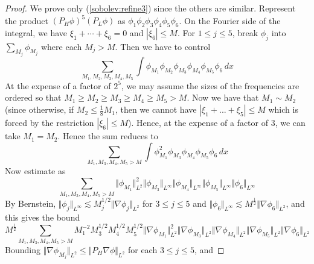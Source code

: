 \documentclass[12pt,letterpaper,leqno]{amsart}
\theoremstyle{plain}
\numberwithin{equation}{section}
\numberwithin{theorem}{section}
\numberwithin{proposition}{section}
\numberwithin{lemma}{section}
\numberwithin{corollary}{section}
\begin{document}
\begin{proof}
We prove only (\ref{sobolev:refine3}) since the others are similar.
Represent the product $\left( P_{H}\phi \right) ^{5}\left( P_{L}\phi \right) 
$ as $\phi _{1}\phi _{2}\phi _{3}\phi _{4}\phi _{5}\phi _{6}$. On the
Fourier side of the integral, we have $\xi _{1}+\cdots +\xi _{6}=0$ and $%
\left\vert \xi _{6}\right\vert \leqslant M$. For $1\leqslant j\leqslant 5$,
break $\phi _{j}$ into $\sum_{M_{j}}\phi _{M_{j}}$ where each $M_{j}>M$.
Then we have to control 
\begin{equation*}
\sum_{M_{1},M_{2},M_{3},M_{4},M_{5}}\int \phi _{M_{1}}\phi _{M_{2}}\phi
_{M_{3}}\phi _{M_{4}}\phi _{M_{5}}\phi _{6}\,dx
\end{equation*}%
At the expense of a factor of $2^{5}$, we may assume the sizes of the
frequencies are ordered so that $M_{1}\geqslant M_{2}\geqslant
M_{3}\geqslant M_{4}\geqslant M_{5}>M$. Now we have that $M_{1}\sim M_{2}$
(since otherwise, if $M_{2}\leq \frac{1}{8}M_{1}$, then we cannot have $%
\left\vert \xi _{1}+...+\xi _{5}\right\vert \leqslant M$ which is forced by
the restriction $\left\vert \xi _{6}\right\vert \leqslant M$). Hence, at the
expense of a factor of $3$, we can take $M_{1}=M_{2}$. Hence the sum reduces
to 
\begin{equation*}
\sum_{M_{1},M_{3},M_{4},M_{5}>M}\int \phi _{M_{1}}^{2}\phi _{M_{3}}\phi
_{M_{4}}\phi _{M_{5}}\phi _{6}\,dx
\end{equation*}%
Now estimate as 
\begin{equation*}
\sum_{M_{1},M_{3},M_{4},M_{5}>M}\Vert \phi _{M_{1}}\Vert _{L^{2}}^{2}\Vert
\phi _{M_{3}}\Vert _{L^{\infty }}\Vert \phi _{M_{4}}\Vert _{L^{\infty
}}\Vert \phi _{M_{5}}\Vert _{L^{\infty }}\Vert \phi _{6}\Vert _{L^{\infty }}
\end{equation*}%
By Bernstein, $\Vert \phi _{j}\Vert _{L^{\infty }}\lesssim M_{j}^{1/2}\Vert
\nabla \phi _{j}\Vert _{L^{2}}$ for $3\leqslant j\leqslant 5$ and $\Vert
\phi _{6}\Vert _{L^{\infty }}\lesssim M^{\frac{1}{2}}\Vert \nabla \phi
_{6}\Vert _{L^{2}}$, and this gives the bound 
\begin{equation*}
M^{\frac{1}{2}%
}\sum_{M_{1},M_{3},M_{4},M_{5}>M}M_{1}^{-2}M_{3}^{1/2}M_{4}^{1/2}M_{5}^{1/2}%
\Vert \nabla \phi _{M_{1}}\Vert _{L^{2}}^{2}\Vert \nabla \phi _{M_{3}}\Vert
_{L^{2}}\Vert \nabla \phi _{M_{4}}\Vert _{L^{2}}\Vert \nabla \phi
_{M_{5}}\Vert _{L^{2}}\Vert \nabla \phi _{6}\Vert _{L^{2}}
\end{equation*}%
Bounding $\Vert \nabla \phi _{M_{j}}\Vert _{L^{2}}\leqslant \Vert
P_{H}\nabla \phi \Vert _{L^{2}}$ for each $3\leqslant j\leqslant 5$, and

\end{proof}
\end{document}
